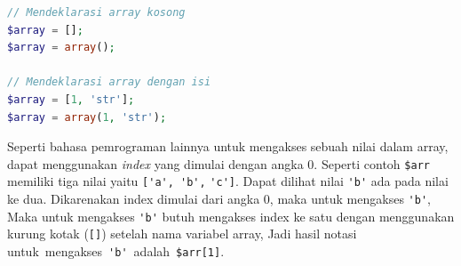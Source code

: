 \documentclass[a4paper,twoside]{article}
\begin{document}
\begin{enumerate}
\begin{itemize}
		            \begin{lstlisting}[language={php}, caption={Contoh mendeklarasi variabel array}, label={kode:5:array_ex}]
// Mendeklarasi array kosong
$array = [];
$array = array();

// Mendeklarasi array dengan isi
$array = [1, 'str'];
$array = array(1, 'str');
			  		\end{lstlisting}

		            Seperti bahasa pemrograman lainnya untuk mengakses sebuah nilai dalam array, dapat menggunakan \textit{index} yang dimulai dengan angka 0. Seperti contoh \verb|$arr| memiliki tiga nilai yaitu \verb|['a', 'b',| \verb|'c']|. Dapat dilihat nilai \verb|'b'| ada pada nilai ke dua. Dikarenakan index dimulai dari angka 0, maka untuk mengakses \verb|'b'|, Maka untuk mengakses \verb|'b'| butuh mengakses index ke satu dengan menggunakan kurung kotak (\verb|[]|) setelah nama variabel array, Jadi hasil notasi \mbox{untuk~mengakses}~\verb|'b'|~adalah~\verb|$arr[1]|.

\end{itemize}
\end{enumerate}
\end{document}
